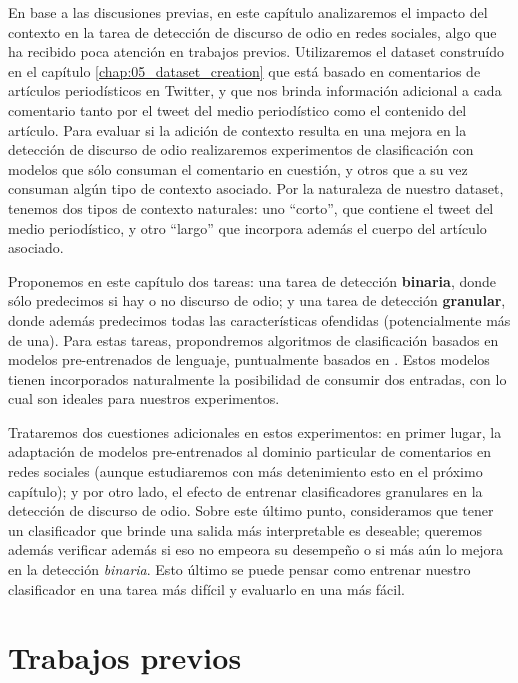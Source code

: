 \label{chap:06_contextualized_hate_speech}
En base a las discusiones previas, en este capítulo analizaremos el impacto del contexto en la tarea de detección de discurso de odio en redes sociales, algo que ha recibido poca atención en trabajos previos. Utilizaremos el dataset construído en el capítulo \ref{chap:05_dataset_creation} que está basado en comentarios de artículos periodísticos en Twitter, y que nos brinda información adicional a cada comentario tanto por el tweet del medio periodístico como el contenido del artículo. Para evaluar si la adición de contexto resulta en una mejora en la detección de discurso de odio realizaremos experimentos de clasificación con modelos que sólo consuman el comentario en cuestión, y otros que a su vez consuman algún tipo de contexto asociado. Por la naturaleza de nuestro dataset, tenemos dos tipos de contexto naturales: uno ``corto'', que contiene el tweet del medio periodístico, y otro ``largo'' que incorpora además el cuerpo del artículo asociado.

Proponemos en este capítulo dos tareas: una tarea de detección \textbf{binaria}, donde sólo predecimos si hay o no discurso de odio; y una tarea de detección \textbf{granular}, donde además predecimos todas las características ofendidas (potencialmente más de una). Para estas tareas, propondremos algoritmos de clasificación basados en modelos pre-entrenados de lenguaje, puntualmente basados en \beto{}. Estos modelos tienen incorporados naturalmente la posibilidad de consumir dos entradas, con lo cual son ideales para nuestros experimentos.


Trataremos dos cuestiones adicionales en estos experimentos: en primer lugar, la adaptación de modelos pre-entrenados al dominio particular de comentarios en redes sociales (aunque estudiaremos con más detenimiento esto en el próximo capítulo); y por otro lado, el efecto de entrenar clasificadores granulares en la detección de discurso de odio. Sobre este último punto, consideramos que tener un clasificador que brinde una salida más interpretable es deseable; queremos además verificar además si eso no empeora su desempeño o si más aún lo mejora en la detección \emph{binaria}. Esto último se puede pensar como entrenar nuestro clasificador en una tarea más difícil y evaluarlo en una más fácil.


\section{Trabajos previos}
\label{sec:06_classification_previous}

